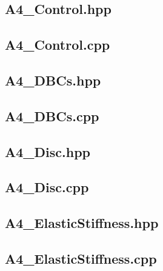 \documentclass[a4paper, 12pt]{article}
\begin{document}
\subsection{A4\_Control.hpp} \label{subsec:Cont.hpp}


\subsection{A4\_Control.cpp} \label{subsec:Cont.cpp}


\subsection{A4\_DBCs.hpp} \label{subsec:DBCs.hpp}


\subsection{A4\_DBCs.cpp} \label{subsec:DBCs.cpp}


\subsection{A4\_Disc.hpp} \label{subsec:Disc.hpp}


\subsection{A4\_Disc.cpp} \label{subsec:Disc.cpp}


\subsection{A4\_ElasticStiffness.hpp} \label{subsec:ElasticStiffness.hpp}


\subsection{A4\_ElasticStiffness.cpp} \label{subsec:ElasticStiffness.cpp}

\end{document}
